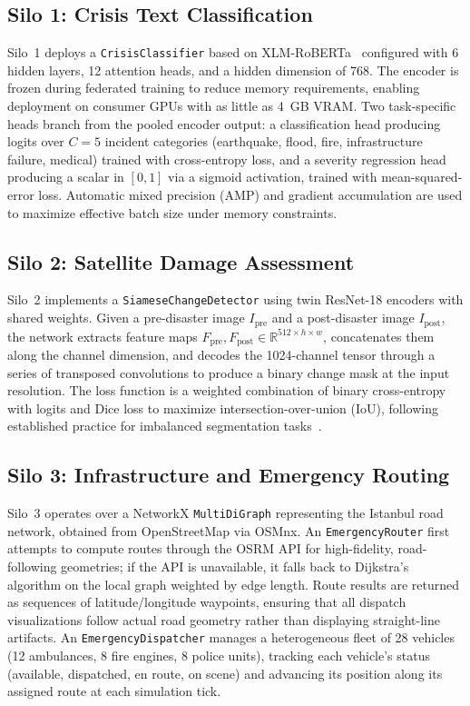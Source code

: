 \documentclass[conference]{IEEEtran}
\begin{document}
\subsection{Silo 1: Crisis Text Classification}

Silo~1 deploys a \texttt{CrisisClassifier} based on XLM-RoBERTa~\cite{b8} configured with 6 hidden layers, 12 attention heads, and a hidden dimension of 768. The encoder is frozen during federated training to reduce memory requirements, enabling deployment on consumer GPUs with as little as 4~GB VRAM. Two task-specific heads branch from the pooled encoder output: a classification head producing logits over $C = 5$ incident categories (earthquake, flood, fire, infrastructure failure, medical) trained with cross-entropy loss, and a severity regression head producing a scalar in $[0, 1]$ via a sigmoid activation, trained with mean-squared-error loss. Automatic mixed precision (AMP) and gradient accumulation are used to maximize effective batch size under memory constraints.

\subsection{Silo 2: Satellite Damage Assessment}

Silo~2 implements a \texttt{SiameseChangeDetector} using twin ResNet-18 encoders with shared weights. Given a pre-disaster image $I_{\text{pre}}$ and a post-disaster image $I_{\text{post}}$, the network extracts feature maps $F_{\text{pre}}, F_{\text{post}} \in \mathbb{R}^{512 \times h \times w}$, concatenates them along the channel dimension, and decodes the 1024-channel tensor through a series of transposed convolutions to produce a binary change mask at the input resolution. The loss function is a weighted combination of binary cross-entropy with logits and Dice loss to maximize intersection-over-union (IoU), following established practice for imbalanced segmentation tasks~\cite{b7}.

\subsection{Silo 3: Infrastructure and Emergency Routing}

Silo~3 operates over a NetworkX \texttt{MultiDiGraph} representing the Istanbul road network, obtained from OpenStreetMap via OSMnx. An \texttt{EmergencyRouter} first attempts to compute routes through the OSRM API for high-fidelity, road-following geometries; if the API is unavailable, it falls back to Dijkstra's algorithm on the local graph weighted by edge length. Route results are returned as sequences of latitude/longitude waypoints, ensuring that all dispatch visualizations follow actual road geometry rather than displaying straight-line artifacts. An \texttt{EmergencyDispatcher} manages a heterogeneous fleet of 28 vehicles (12 ambulances, 8 fire engines, 8 police units), tracking each vehicle's status (available, dispatched, en route, on scene) and advancing its position along its assigned route at each simulation tick.
\end{document}
